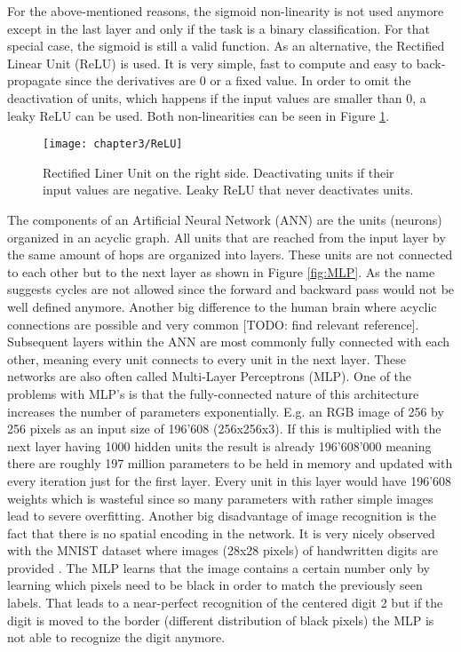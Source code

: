 For the above-mentioned reasons, the sigmoid non-linearity is not used anymore except in the last layer and only if the task is a binary classification. For that special case, the sigmoid is still a valid function. As an alternative, the Rectified Linear Unit (ReLU) is used. It is very simple, fast to compute and easy to back-propagate since the derivatives are 0 or a fixed value. In order to omit the deactivation of units, which happens if the input values are smaller than 0, a leaky ReLU can be used. Both non-linearities can be seen in Figure \ref{fig:ReLU}.

\begin{figure}[H]
  \centering
  \caption{Rectified Liner Unit on the right side. Deactivating units if their input values are negative. Leaky ReLU that never deactivates units. \cite{reinventingNN}}
  \texttt{[image: chapter3/ReLU]}
  \label{fig:ReLU}
\end{figure}

The components of an Artificial Neural Network (ANN) are the units (neurons) organized in an acyclic graph. All units that are reached from the input layer by the same amount of hops are organized into layers. These units are not connected to each other but to the next layer as shown in Figure \ref{fig:MLP}. As the name suggests cycles are not allowed since the forward and backward pass would not be well defined anymore. Another big difference to the human brain where acyclic connections are possible and very common [TODO: find relevant reference]. Subsequent layers within the ANN are most commonly fully connected with each other, meaning every unit connects to every unit in the next layer. These networks are also often called Multi-Layer Perceptrons (MLP). One of the problems with MLP's is that the fully-connected nature of this architecture increases the number of parameters exponentially. E.g. an RGB image of 256 by 256 pixels as an input size of 196'608 (256x256x3). If this is multiplied with the next layer having 1000 hidden units the result is already 196'608'000 meaning there are roughly 197 million parameters to be held in memory and updated with every iteration just for the first layer. Every unit in this layer would have 196'608 weights which is wasteful since so many parameters with rather simple images lead to severe overfitting. Another big disadvantage of image recognition is the fact that there is no spatial encoding in the network. It is very nicely observed with the MNIST dataset where images (28x28 pixels) of handwritten digits are provided \cite{MNISTdatabase}. The MLP learns that the image contains a certain number only by learning which pixels need to be black in order to match the previously seen labels. That leads to a near-perfect recognition of the centered digit 2 but if the digit is moved to the border (different distribution of black pixels) the MLP is not able to recognize the digit anymore.

